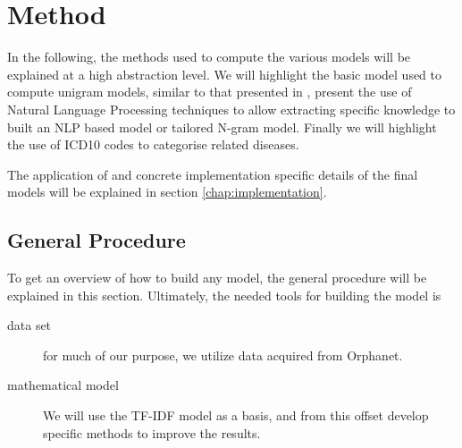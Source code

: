 \documentclass[10pt,letterpaper,final]{article}
\begin{document}








\section{Method}
\label{chap:method}
In the following, the methods used to compute the various models will be
explained at a high abstraction level. We will highlight the basic model
used to compute unigram models, similar to that presented in
\cite{jensenandersen}, present the use of Natural Language Processing
techniques to allow extracting specific knowledge to built an NLP based
model or tailored N-gram model. Finally we will highlight the use of
ICD10 codes to categorise related diseases.

The application of and concrete implementation specific details of the
final models will be explained in section \ref{chap:implementation}.


\subsection{General Procedure}
To get an overview of how to build any model, the general procedure will
be explained in this section.
Ultimately, the needed tools for building the model is
\begin{description}
\item[data set] for much of our purpose, we utilize data acquired from
Orphanet.
\item[mathematical model] We will use the TF-IDF model as a basis, and
from this offset develop specific methods to improve the results.
\end{description}
\end{document}
